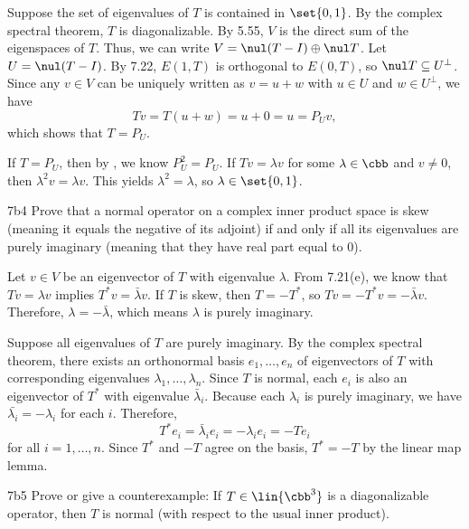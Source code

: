 \begin{soliff}
    \rightimp Suppose the set of eigenvalues of $T$ is contained in $\set{0, 1}$.
    By the complex spectral theorem, $T$ is diagonalizable.
    By 5.55, $V$ is the direct sum of the eigenspaces of $T$.
    Thus, we can write $V = \nul(T - I) \oplus \nul T$.
    Let $U = \nul(T - I)$.
    By 7.22, $E(1, T)$ is orthogonal to $E(0, T)$, so $\nul T \subseteq U^\perp$.
    Since any $v \in V$ can be uniquely written as $v = u + w$ with $u \in U$ and $w \in U^\perp$, we have
    \[
        T v = T(u + w) = u + 0 = u = P_U v,
    \]
    which shows that $T = P_U$.

    \leftimp If $T = P_U$, then by , we know $P_U^2 = P_U$.
    If $Tv = \lambda v$ for some $\lambda \in \cbb$ and $v \neq 0$, then $\lambda^2v = \lambda v$.
    This yields $\lambda^2 = \lambda$, so $\lambda \in \set{0, 1}$.
\end{soliff}

\begin{exercise}{7b4}
    Prove that a normal operator on a complex inner product space is skew (meaning it equals the negative of its adjoint) if and only if all its eigenvalues are purely imaginary (meaning that they have real part equal to $0$).
\end{exercise}

\begin{soliff}
    \rightimp Let $v \in V$ be an eigenvector of $T$ with eigenvalue $\lambda$.
    From 7.21(e), we know that $Tv = \lambda v$ implies $T^\ast v = \bar\lambda v$.
    If $T$ is skew, then $T = -T^\ast$, so $Tv = -T^\ast v = -\bar\lambda v$.
    Therefore, $\lambda = -\bar\lambda$, which means $\lambda$ is purely imaginary.

    \leftimp Suppose all eigenvalues of $T$ are purely imaginary.
    By the complex spectral theorem, there exists an orthonormal basis $e_1, \ldots, e_n$ of eigenvectors of $T$ with corresponding eigenvalues $\lambda_1, \ldots, \lambda_n$.
    Since $T$ is normal, each $e_i$ is also an eigenvector of $T^\ast$ with eigenvalue $\bar\lambda_i$.
    Because each $\lambda_i$ is purely imaginary, we have $\bar{\lambda_i} = -\lambda_i$ for each $i$.
    Therefore,
    \[
        T^\ast e_i = \bar\lambda_i e_i = -\lambda_i e_i = -T e_i
    \]
    for all $i = 1, \ldots, n$.
    Since $T^\ast$ and $-T$ agree on the basis, $T^\ast = -T$ by the linear map lemma.
\end{soliff}

\begin{exercise}{7b5}
    Prove or give a counterexample: If $T \in \lin{\cbb^3}$ is a diagonalizable operator, then $T$ is normal (with respect to the usual inner product).
\end{exercise}

